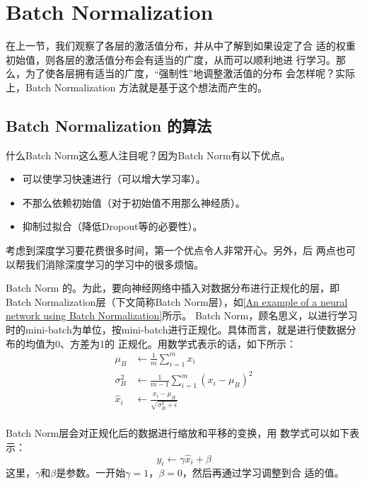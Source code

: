 \section{Batch Normalization}
在上一节，我们观察了各层的激活值分布，并从中了解到如果设定了合
适的权重初始值，则各层的激活值分布会有适当的广度，从而可以顺利地进
行学习。那么，为了使各层拥有适当的广度，“强制性”地调整激活值的分布
会怎样呢？实际上，Batch Normalization 方法就是基于这个想法而产生的。
\subsection{Batch Normalization 的算法}
什么Batch Norm这么惹人注目呢？因为Batch Norm有以下优点。
\begin{itemize}
    \item 可以使学习快速进行（可以增大学习率）。
    \item 不那么依赖初始值（对于初始值不用那么神经质）。
    \item 抑制过拟合（降低Dropout等的必要性）。
\end{itemize}
考虑到深度学习要花费很多时间，第一个优点令人非常开心。另外，后
两点也可以帮我们消除深度学习的学习中的很多烦恼。

Batch Norm 的。为此，要向神经网络中插入对数据分布进行正规化的层，即Batch
Normalization层（下文简称Batch Norm层），如\autoref{An example of a neural network using Batch Normalization}所示。
Batch Norm，顾名思义，以进行学习时的mini-batch为单位，按mini-batch进行正规化。具体而言，就是进行使数据分布的均值为0、方差为1的
正规化。用数学式表示的话，如下所示：
\begin{equation*}
    \begin{aligned}
        \mu_B      & \leftarrow \frac{1}{m}\sum\limits_{i=1}^mx_i             \\
        \sigma_B^2 & \leftarrow \frac{1}{m-1}\sum\limits_{i=1}^m(x_i-\mu_B)^2 \\
        \hat{x}_i  & \leftarrow \frac{x_i-\mu_B}{\sqrt{\sigma_B^2+\epsilon}}  \\
    \end{aligned}
\end{equation*}

Batch Norm层会对正规化后的数据进行缩放和平移的变换，用
数学式可以如下表示：
\begin{equation*}
    y_i\leftarrow \gamma\hat{x}_i+\beta
\end{equation*}
这里，$\gamma$和$\beta$是参数。一开始$\gamma=1$，$\beta=0$，然后再通过学习调整到合
适的值。

